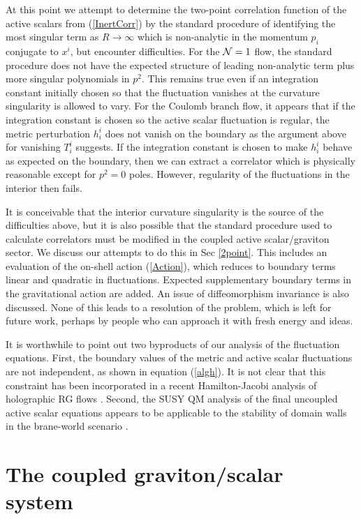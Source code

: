 \documentclass[a4paper,12pt]{article}
\begin{document}
At this point we attempt to determine the two-point correlation
function of the active scalars from (\ref{InertCorr}) by the standard
procedure of identifying the most singular term as $R \rightarrow
\infty$ which is non-analytic in the momentum $p_i$ conjugate to
$x^i$, but encounter difficulties. For the ${\cal N}=1$ flow, the
standard procedure does not have the expected structure of leading
non-analytic term plus more singular polynomials in $p^2$. This
remains true even if an integration constant initially chosen so that
the fluctuation vanishes at the curvature singularity is allowed to
vary. For the Coulomb branch flow, it appears that if the integration
constant is chosen so the active scalar fluctuation is regular, the
metric perturbation $h^i_i$ does not vanish on the boundary as the
argument above for vanishing $T^i_i$ suggests. If the integration
constant is chosen to make $h^i_i$ behave as expected on the boundary,
then we can extract a correlator which is physically reasonable except
for $p^2=0$ poles.  However, regularity of the fluctuations in the
interior then fails.

It is conceivable that the interior curvature singularity is the
source of the difficulties above, but it is also possible that the
standard procedure used to calculate correlators must be modified in
the coupled active scalar/graviton sector. We discuss our attempts to
do this in Sec \ref{2point}. This includes an evaluation of the
on-shell action (\ref{Action}), which reduces to boundary terms linear
and quadratic in fluctuations.  Expected supplementary boundary terms
in the gravitational action are added. An issue of diffeomorphism
invariance is also discussed. None of this leads to a resolution of
the problem, which is left for future work, perhaps by people who can
approach it with fresh energy and ideas.

It is worthwhile to point out two byproducts of our analysis of the
fluctuation equations.  First, the boundary values of the metric and
active scalar fluctuations are not independent, as shown in equation
(\ref{algh}).  It is not clear that this constraint has been
incorporated in a recent Hamilton-Jacobi analysis of holographic RG
flows \cite{dbvv}.  Second, the SUSY QM analysis of the final
uncoupled active scalar equations appears to be applicable to the
stability of domain walls in the brane-world scenario \cite{rs1, rs2,
gw, dfgk}.


\section{The coupled graviton/scalar system}
\label{equations}
\end{document}
